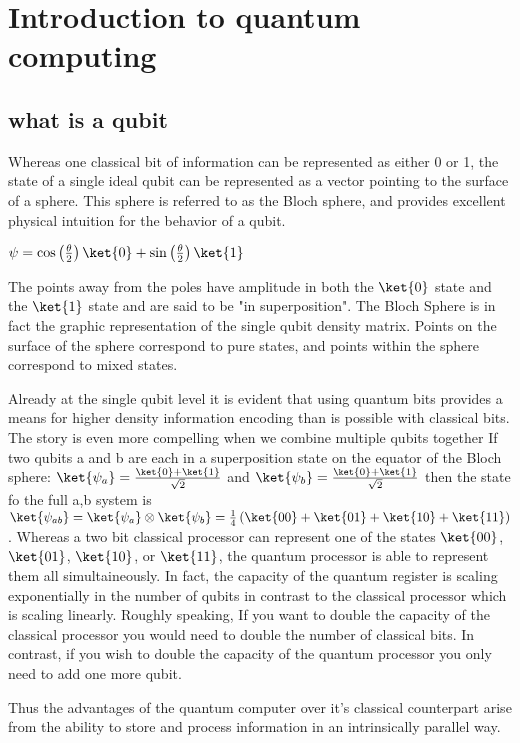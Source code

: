 \chapter{Introduction to quantum computing}
\section{what is a qubit}

Whereas one classical bit of information can be represented as either 0 or 1, the state of a single ideal qubit can be represented as a vector pointing to the surface of a sphere.
This sphere is referred to as the Bloch sphere, and provides excellent physical intuition for the behavior of a qubit.

$\psi = \cos \left( \frac{\theta}{2} \right) \ket{0} + \sin \left( \frac{\theta}{2} \right)\ket{1} $

The points away from the poles have amplitude in both the $\ket{0}$ state and the $\ket{1}$ state and are said to be "in superposition".
The Bloch Sphere is in fact the graphic representation of the single qubit density matrix.
Points on the surface of the sphere correspond to pure states, and points within the sphere correspond to mixed states.

Already at the single qubit level it is evident that using quantum bits provides a means for higher density information encoding than is possible with classical bits.
The story is even more compelling when we combine multiple qubits together
If two qubits a and b are each in a superposition state on the equator of the Bloch sphere:
$\ket{\psi_a} = \frac{\ket{0}+\ket{1}}{\sqrt{2}}$ and $\ket{\psi_b} = \frac{\ket{0}+\ket{1}}{\sqrt{2}}$
then the state fo the full a,b system is
$\ket{\psi_{ab}} = \ket{\psi_a} \otimes \ket{\psi_b} = \frac{1}{4} \left( \ket{00} + \ket{01} + \ket{10} + \ket{11} \right)$.
Whereas a two bit classical processor can represent one of the states $\ket{00}$, $\ket{01}$, $\ket{10}$, or $\ket{11}$, the quantum processor is able to represent them all simultaineously.
In fact, the capacity of the quantum register is scaling exponentially in the number of qubits in contrast to the classical processor which is scaling linearly.
Roughly speaking, If you want to double the capacity of the classical processor you would need to double the number of classical bits.
In contrast, if you wish to double the capacity of the quantum processor you only need to add one more qubit.

Thus the advantages of the quantum computer over it's classical counterpart arise from the ability to store and process information in an intrinsically parallel way.

